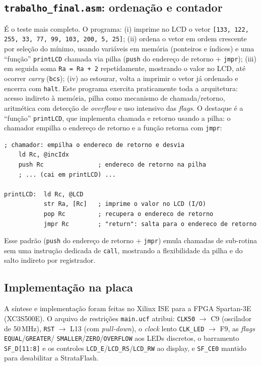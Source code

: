 \documentclass[12pt,a4paper]{article}
\begin{document}
\subsection{\texttt{trabalho\_final.asm}: ordenação e contador}

É o teste mais completo. O programa: (i) imprime no LCD o vetor
\texttt{[133, 122, 255, 33, 77, 99, 103, 200, 5, 25]}; (ii) ordena o vetor em ordem
crescente por seleção do mínimo, usando variáveis em memória (ponteiros e índices) e uma
``função'' \texttt{printLCD} chamada via pilha (\texttt{push} do endereço de retorno +
\texttt{jmpr}); (iii) em seguida soma \texttt{Ra = Ra + 2} repetidamente, mostrando o valor
no LCD, até ocorrer \textit{carry} (\texttt{bcs}); (iv) ao estourar, volta a imprimir o
vetor já ordenado e encerra com \texttt{halt}. Este programa exercita praticamente toda a
arquitetura: acesso indireto à memória, pilha como mecanismo de chamada/retorno, aritmética
com detecção de \textit{overflow} e uso intensivo das \textit{flags}. O destaque é a
``função'' \texttt{printLCD}, que implementa chamada e retorno usando a pilha: o chamador
empilha o endereço de retorno e a função retorna com \texttt{jmpr}:

\noindent\begin{minipage}{\linewidth}
\begin{lstlisting}[style=asm]
; chamador: empilha o endereco de retorno e desvia
    ld Rc, @incIdx
    push Rc               ; endereco de retorno na pilha
    ; ... (cai em printLCD) ...

printLCD:  ld Rc, @LCD
           str Ra, [Rc]   ; imprime o valor no LCD (I/O)
           pop Rc         ; recupera o endereco de retorno
           jmpr Rc        ; "return": salta para o endereco de retorno
\end{lstlisting}
\end{minipage}

Esse padrão (\texttt{push} do endereço de retorno + \texttt{jmpr}) emula chamadas de
sub-rotina sem uma instrução dedicada de \texttt{call}, mostrando a flexibilidade da pilha e
do salto indireto por registrador.

\subsection{Implementação na placa}

A síntese e implementação foram feitas no Xilinx ISE para a FPGA Spartan-3E (XC3S500E). O
arquivo de restrições \texttt{main.ucf} atribui: \texttt{CLK50} $\to$ C9 (oscilador de
50\,MHz), \texttt{RST} $\to$ L13 (com \textit{pull-down}), o \textit{clock} lento
\texttt{CLK\_LED} $\to$ F9, as \textit{flags} \texttt{EQUAL}/\texttt{GREATER}/%
\texttt{SMALLER}/\texttt{ZERO}/\texttt{OVERFLOW} aos LEDs discretos, o barramento
\texttt{SF\_D[11:8]} e os controles \texttt{LCD\_E}/\texttt{LCD\_RS}/\texttt{LCD\_RW} ao
display, e \texttt{SF\_CE0} mantido para desabilitar a StrataFlash.
\end{document}
